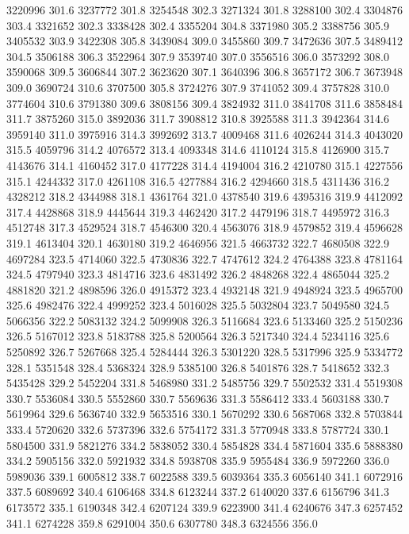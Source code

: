 3220996 301.6
3237772 301.8
3254548 302.3
3271324 301.8
3288100 302.4
3304876 303.4
3321652 302.3
3338428 302.4
3355204 304.8
3371980 305.2
3388756 305.9
3405532 303.9
3422308 305.8
3439084 309.0
3455860 309.7
3472636 307.5
3489412 304.5
3506188 306.3
3522964 307.9
3539740 307.0
3556516 306.0
3573292 308.0
3590068 309.5
3606844 307.2
3623620 307.1
3640396 306.8
3657172 306.7
3673948 309.0
3690724 310.6
3707500 305.8
3724276 307.9
3741052 309.4
3757828 310.0
3774604 310.6
3791380 309.6
3808156 309.4
3824932 311.0
3841708 311.6
3858484 311.7
3875260 315.0
3892036 311.7
3908812 310.8
3925588 311.3
3942364 314.6
3959140 311.0
3975916 314.3
3992692 313.7
4009468 311.6
4026244 314.3
4043020 315.5
4059796 314.2
4076572 313.4
4093348 314.6
4110124 315.8
4126900 315.7
4143676 314.1
4160452 317.0
4177228 314.4
4194004 316.2
4210780 315.1
4227556 315.1
4244332 317.0
4261108 316.5
4277884 316.2
4294660 318.5
4311436 316.2
4328212 318.2
4344988 318.1
4361764 321.0
4378540 319.6
4395316 319.9
4412092 317.4
4428868 318.9
4445644 319.3
4462420 317.2
4479196 318.7
4495972 316.3
4512748 317.3
4529524 318.7
4546300 320.4
4563076 318.9
4579852 319.4
4596628 319.1
4613404 320.1
4630180 319.2
4646956 321.5
4663732 322.7
4680508 322.9
4697284 323.5
4714060 322.5
4730836 322.7
4747612 324.2
4764388 323.8
4781164 324.5
4797940 323.3
4814716 323.6
4831492 326.2
4848268 322.4
4865044 325.2
4881820 321.2
4898596 326.0
4915372 323.4
4932148 321.9
4948924 323.5
4965700 325.6
4982476 322.4
4999252 323.4
5016028 325.5
5032804 323.7
5049580 324.5
5066356 322.2
5083132 324.2
5099908 326.3
5116684 323.6
5133460 325.2
5150236 326.5
5167012 323.8
5183788 325.8
5200564 326.3
5217340 324.4
5234116 325.6
5250892 326.7
5267668 325.4
5284444 326.3
5301220 328.5
5317996 325.9
5334772 328.1
5351548 328.4
5368324 328.9
5385100 326.8
5401876 328.7
5418652 332.3
5435428 329.2
5452204 331.8
5468980 331.2
5485756 329.7
5502532 331.4
5519308 330.7
5536084 330.5
5552860 330.7
5569636 331.3
5586412 333.4
5603188 330.7
5619964 329.6
5636740 332.9
5653516 330.1
5670292 330.6
5687068 332.8
5703844 333.4
5720620 332.6
5737396 332.6
5754172 331.3
5770948 333.8
5787724 330.1
5804500 331.9
5821276 334.2
5838052 330.4
5854828 334.4
5871604 335.6
5888380 334.2
5905156 332.0
5921932 334.8
5938708 335.9
5955484 336.9
5972260 336.0
5989036 339.1
6005812 338.7
6022588 339.5
6039364 335.3
6056140 341.1
6072916 337.5
6089692 340.4
6106468 334.8
6123244 337.2
6140020 337.6
6156796 341.3
6173572 335.1
6190348 342.4
6207124 339.9
6223900 341.4
6240676 347.3
6257452 341.1
6274228 359.8
6291004 350.6
6307780 348.3
6324556 356.0
